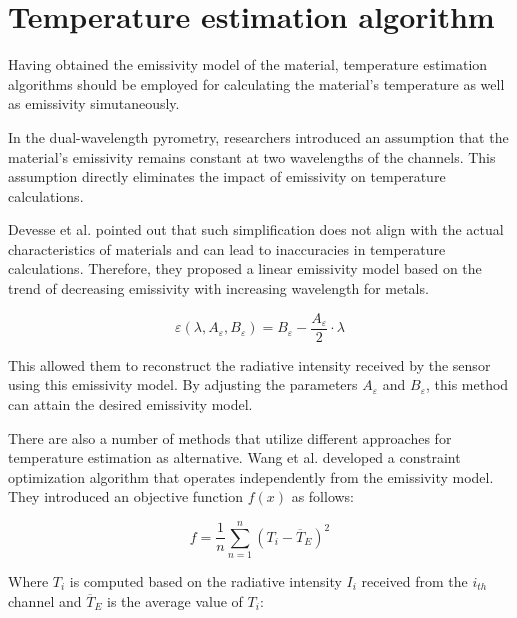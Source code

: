 \section{Temperature estimation algorithm}
Having obtained the emissivity model of the material, temperature estimation 
algorithms should be employed for calculating the material's 
temperature as well as emissivity simutaneously.


In the dual-wavelength pyrometry, researchers introduced an assumption 
that the material's emissivity remains constant at two 
wavelengths of the channels. This assumption directly eliminates the 
impact of emissivity on temperature calculations\cite{Grujic.2023}.


Devesse et al. pointed out that such simplification does not align 
with the actual characteristics of materials and can lead to inaccuracies 
in temperature calculations\cite{Devesse.2017}. Therefore, they proposed 
a linear emissivity model based on the trend of decreasing emissivity with 
increasing wavelength for metals. 

\begin{equation}
    \varepsilon(\lambda, A_{\varepsilon}, B_{\varepsilon}) = B_{\varepsilon} - \frac{A_{\varepsilon}}{2} \cdot \lambda
\end{equation}

This allowed them to reconstruct the 
radiative intensity received by the sensor using this emissivity model.
By adjusting the parameters $A_{\varepsilon}$ and $B_{\varepsilon}$, this 
method can attain the desired emissivity model.


There are also a number of methods that utilize different approaches for temperature
estimation as alternative.
Wang et al. developed a constraint optimization algorithm that 
operates independently from the emissivity model\cite{Wang.2021b}. They 
introduced an objective function $f(x)$ as follows:

\begin{equation}
    \label{eq: fun_wang_2021b}
    f=\frac{1}{n}\sum_{n = 1}^{n}\left(T_i - \overline{T}_E \right)^2  
\end{equation}

Where $T_i$ is computed based on the radiative intensity $I_i$ received from 
the $i_{th}$ channel and $\overline{T}_E$ is the average value of $T_i$:

